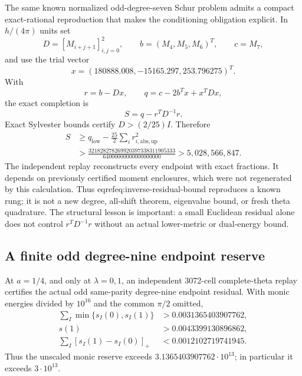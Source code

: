 \documentclass[11pt]{article}
\theoremstyle{definition}
\theoremstyle{remark}
\begin{document}
The same known normalized odd-degree-seven Schur problem admits a compact
exact-rational reproduction that makes the conditioning obligation explicit.
In $h/(4\pi)$ units set
\begin{equation}
 D=[M_{i+j+1}]_{i,j=0}^{2},\qquad
 b=(M_4,M_5,M_6)^T,\qquad c=M_7,
\end{equation}
and use the trial vector
\begin{equation}
 x=(180888.008,-15165.297,253.796275)^T.
\end{equation}
With
\begin{equation}
 r=b-Dx,\qquad q=c-2b^Tx+x^TDx,
\end{equation}
the exact completion is
\begin{equation}
 S=q-r^TD^{-1}r.
 \label{eq:inverse-residual-completion}
\end{equation}
Exact Sylvester bounds certify $D>(2/25)I$. Therefore
\begin{align}
 S&\ge q_{\mathrm{low}}-\frac{25}{2}
       \sum_i r_{i,\mathrm{abs},\mathrm{up}}^2\nonumber\\
 &>\frac{321828278269920397338311905333}
          {64000000000000000000}
  >5{,}028{,}566{,}847.
 \label{eq:inverse-residual-bound}
\end{align}
The independent replay reconstructs every endpoint with exact fractions. It
depends on previously certified moment enclosures, which were not regenerated
by this calculation. Thus eqref{eq:inverse-residual-bound} reproduces a known
rung; it is not a new degree, all-shift theorem, eigenvalue bound, or fresh
theta quadrature. The structural lesson is important: a small Euclidean
residual alone does not control $r^TD^{-1}r$ without an actual lower-metric or
dual-energy bound.

\subsection{A finite odd degree-nine endpoint reserve}

At $a=1/4$, and only at $\lambda=0,1$, an independent 3072-cell
complete-theta replay certifies the actual odd same-parity degree-nine endpoint
residual. With monic energies divided by $10^{16}$ and the common $\pi/2$
omitted,
\begin{align}
 \sum_I\min\{s_I(0),s_I(1)\}
   &>0.0031365403907762,\nonumber\\
 s(1)&>0.0043399130896862,\nonumber\\
 \sum_I[s_I(1)-s_I(0)]_+
   &<0.0012102719741945.
 \label{eq:odd9-endpoint}
\end{align}
Thus the unscaled monic reserve exceeds
$3.1365403907762\cdot10^{13}$; in particular it exceeds $3\cdot10^{13}$.
\end{document}
